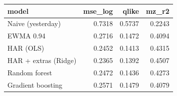 \begin{tabular}{lrrr}
\toprule
model & mse_log & qlike & mz_r2 \\
\midrule
Naive (yesterday) & 0.7318 & 0.5737 & 0.2243 \\
EWMA 0.94 & 0.2716 & 0.1472 & 0.4094 \\
HAR (OLS) & 0.2452 & 0.1413 & 0.4315 \\
HAR + extras (Ridge) & 0.2365 & 0.1392 & 0.4507 \\
Random forest & 0.2472 & 0.1436 & 0.4273 \\
Gradient boosting & 0.2571 & 0.1479 & 0.4079 \\
\bottomrule
\end{tabular}
